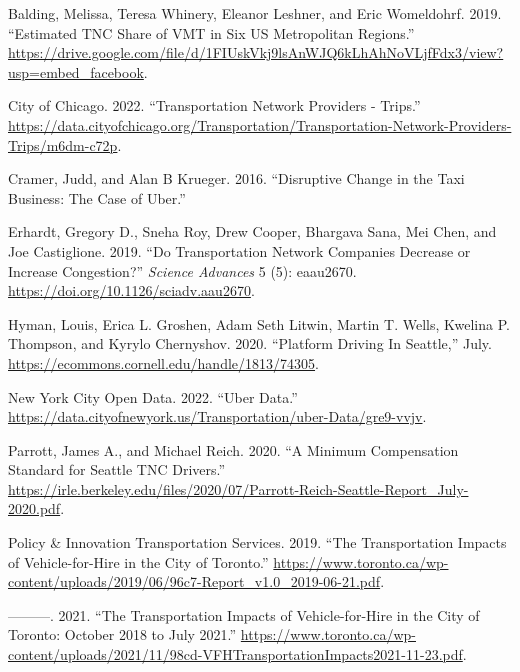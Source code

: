 \documentclass[
  letterpaper,
  DIV=11,
  numbers=noendperiod]{scrartcl}
\newlength{\cslhangindent}
\newlength{\cslentryspacingunit} %
\newenvironment{CSLReferences}[2] %
 {%
  \setlength{\parindent}{0pt}
  \ifodd #1
  \let\oldpar\par
  \def\par{\hangindent=\cslhangindent\oldpar}
  \fi
  \setlength{\parskip}{#2\cslentryspacingunit}
 }%
 {}
\begin{document}
\hypertarget{refs}{}
\begin{CSLReferences}{1}{0}
\leavevmode{}%
Balding, Melissa, Teresa Whinery, Eleanor Leshner, and Eric Womeldohrf.
2019. {``Estimated TNC Share of VMT in Six US Metropolitan Regions.''}
\url{https://drive.google.com/file/d/1FIUskVkj9lsAnWJQ6kLhAhNoVLjfFdx3/view?usp=embed_facebook}.

\leavevmode{}%
City of Chicago. 2022. {``Transportation Network Providers - Trips.''}
\url{https://data.cityofchicago.org/Transportation/Transportation-Network-Providers-Trips/m6dm-c72p}.

\leavevmode{}%
Cramer, Judd, and Alan B Krueger. 2016. {``Disruptive Change in the Taxi
Business: The Case of Uber.''}

\leavevmode{}%
Erhardt, Gregory D., Sneha Roy, Drew Cooper, Bhargava Sana, Mei Chen,
and Joe Castiglione. 2019. {``Do Transportation Network Companies
Decrease or Increase Congestion?''} \emph{Science Advances} 5 (5):
eaau2670. \url{https://doi.org/10.1126/sciadv.aau2670}.

\leavevmode{}%
Hyman, Louis, Erica L. Groshen, Adam Seth Litwin, Martin T. Wells,
Kwelina P. Thompson, and Kyrylo Chernyshov. 2020. {``Platform Driving In
Seattle,''} July. \url{https://ecommons.cornell.edu/handle/1813/74305}.

\leavevmode{}%
New York City Open Data. 2022. {``Uber Data.''}
\url{https://data.cityofnewyork.us/Transportation/uber-Data/gre9-vvjv}.

\leavevmode{}%
Parrott, James A., and Michael Reich. 2020. {``A Minimum Compensation
Standard for Seattle TNC Drivers.''}
\url{https://irle.berkeley.edu/files/2020/07/Parrott-Reich-Seattle-Report_July-2020.pdf}.

\leavevmode{}%
Policy \& Innovation Transportation Services. 2019. {``The
Transportation Impacts of Vehicle-for-Hire in the City of Toronto.''}
\url{https://www.toronto.ca/wp-content/uploads/2019/06/96c7-Report_v1.0_2019-06-21.pdf}.

\leavevmode{}%
---------. 2021. {``The Transportation Impacts of Vehicle-for-Hire in
the City of Toronto: October 2018 to July 2021.''}
\url{https://www.toronto.ca/wp-content/uploads/2021/11/98cd-VFHTransportationImpacts2021-11-23.pdf}.


\end{CSLReferences}
\end{document}
